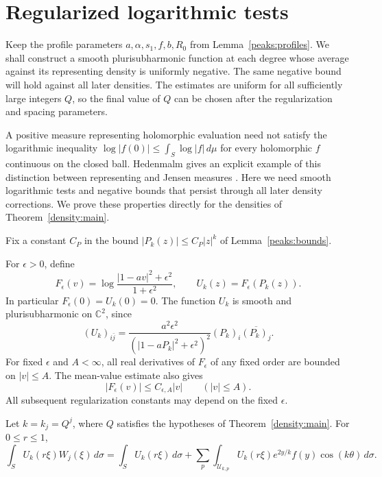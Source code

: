 \section{Regularized logarithmic tests}\label{sec:tests}

Keep the profile parameters $a,\alpha,s_1,f,b,R_0$ from
Lemma~\ref{peaks:profiles}.  We shall construct a smooth
plurisubharmonic function at each degree whose average against its
representing density is uniformly negative.  The same negative bound
will hold against all later densities.  The estimates are uniform for
all sufficiently large integers $Q$, so the final value of $Q$ can be
chosen after the regularization and spacing parameters.

A positive measure representing holomorphic evaluation need not satisfy
the logarithmic inequality
$\log|f(0)|\le\int_S\log|f|\,d\mu$ for every holomorphic $f$
continuous on the closed ball. Hedenmalm gives an explicit example of
this distinction between representing and Jensen measures
\cite[Theorem~3.7]{Hedenmalm1989}.
Here we need smooth logarithmic tests and negative bounds that persist
through all later density corrections. We prove these properties
directly for the densities of Theorem~\ref{density:main}.

Fix a constant $C_P$ in the bound
$|P_k(z)|\le C_P|z|^k$ of Lemma~\ref{peaks:bounds}.

For $\epsilon>0$, define
\begin{equation}\label{tests:regularized}
 F_\epsilon(v)=
 \log\frac{|1-av|^2+\epsilon^2}{1+\epsilon^2},
 \qquad U_k(z)=F_\epsilon(P_k(z)).
\end{equation}
In particular $F_\epsilon(0)=U_k(0)=0$.  The function $U_k$ is smooth
and plurisubharmonic on $\mathbb C^2$, since
\begin{equation}\label{tests:hessian}
 (U_k)_{i\bar j}
 =\frac{a^2\epsilon^2}
        {(|1-aP_k|^2+\epsilon^2)^2}
   (P_k)_i\overline{(P_k)_j}.
\end{equation}
For fixed $\epsilon$ and $A<\infty$, all real derivatives of
$F_\epsilon$ of any fixed order are bounded on $|v|\le A$.
The mean-value estimate also gives
\begin{equation}\label{tests:lipschitz}
 |F_\epsilon(v)|\le C_{\epsilon,A}|v|
 \qquad (|v|\le A).
\end{equation}
All subsequent regularization constants may depend on the fixed
$\epsilon$.

\begin{lemma}\label{tests:averaging}
Let $k=k_j=Q^j$, where $Q$ satisfies the hypotheses of
Theorem~\ref{density:main}.  For $0\le r\le1$,
\begin{equation}\label{tests:averaging-identity}
 \int_S U_k(r\xi)W_j(\xi)\,d\sigma
 =
 \int_S U_k(r\xi)\,d\sigma
 +\sum_p\int_{\mathcal U_{k,p}}
     U_k(r\xi)e^{2y/k}f(y)\cos(k\theta)\,d\sigma.
\end{equation}
\end{lemma}

